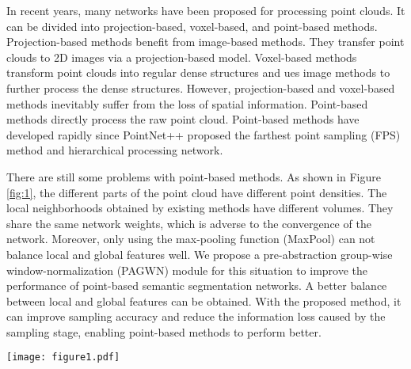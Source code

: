 \documentclass[10pt,twocolumn,letterpaper]{article}
\begin{document}
    In recent years, many networks have been proposed for processing point clouds. It can be divided into projection-based, voxel-based, and point-based methods. Projection-based methods \cite{1Su_2015,2Li_2016,3Chen_2017,4Kanezaki_2018,5Lang_2019,6Tatarchenko_2018} benefit from image-based methods. They transfer point clouds to 2D images via a projection-based model. Voxel-based methods \cite{7Maturana_2015,8Song_2017,9Riegler_2017,10Graham_2018,11Choy_2019} transform point clouds into regular dense structures and ues image methods  to further process the dense structures. However, projection-based and voxel-based methods inevitably suffer from the loss of spatial information. Point-based methods
    \cite{12Charles_2017,13Charles_2017,14Chu_2022,15Hu_2020,16Hu_2020,17Lei_2020,18Liu_2021,19Ye_2022,20Xu_2021,21Yan_2020,22Yang_2019,23Zhao_2019,24Zhao_2021,25Shao_2022} directly process the raw point cloud. Point-based methods have developed rapidly since PointNet++ \cite{13Charles_2017} proposed the farthest point sampling (FPS) method and hierarchical processing network.

    There are still some problems with point-based methods.
    As shown in Figure \ref{fig:1}, the different parts of the point cloud have different point densities.
    The local neighborhoods obtained by existing methods have different volumes.
    They share the same network weights, which is adverse to the convergence of the network.
    Moreover, only using the max-pooling function (MaxPool) can not balance local and global features well.
    We propose a pre-abstraction group-wise window-normalization (PAGWN) module for this situation to improve the performance of point-based semantic segmentation networks.
    A better balance between local and global features can be obtained.
    With the proposed method, it can improve sampling accuracy and reduce the information loss caused by the sampling stage, enabling point-based methods to perform better.
    \begin{figure*}[!htb]
    \centering
    \texttt{[image: figure1.pdf]}
    \caption{Different parts of the point cloud have different point densities. (a) Whole scene. (b) High-density part. (c) Low-density part.}
    \label{fig:1}
    \end{figure*}
\end{document}
